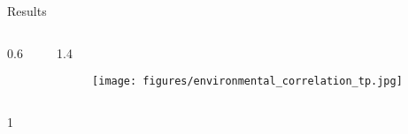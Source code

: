 \documentclass[final]{beamer}
\newlength{\onecolwid}
\newlength{\twocolwid}
\begin{document}
\begin{frame}[t]
\begin{columns}[t]
\begin{column}{\twocolwid}
\begin{block}{Results}
\begin{columns}[t,totalwidth=\twocolwid]
\begin{column}{0.6\onecolwid}
\begin{scriptsize}
\end{scriptsize}






%




\end{column} %

\begin{column}{1.4\onecolwid} %



\begin{figure}
  \texttt{[image: figures/environmental\_correlation\_tp.jpg]}
\end{figure}





\end{column} %

\end{columns} %


\vspace{4cm}




\begin{columns}[t,totalwidth=\twocolwid] %

\begin{column}{1\onecolwid} %





\end{column}
\end{columns}
\end{block}
\end{column}
\end{columns}
\end{frame}
\end{document}
